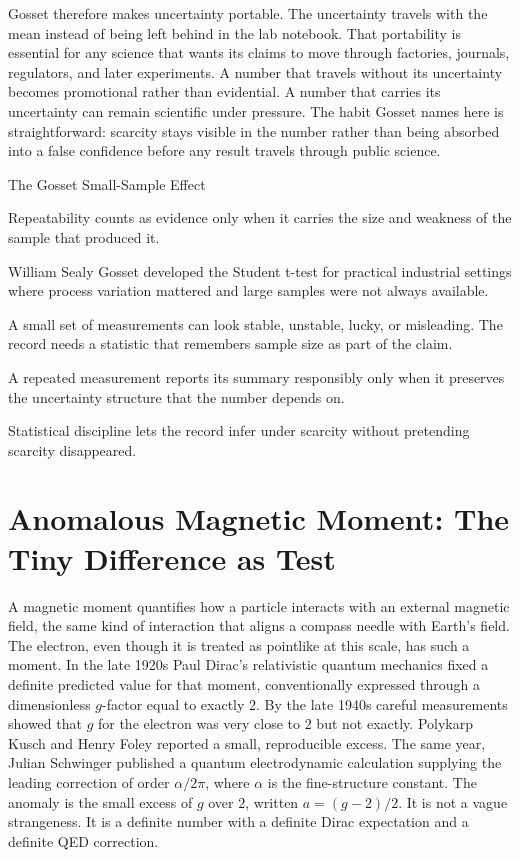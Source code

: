 Gosset therefore makes uncertainty portable. The uncertainty travels with the
mean instead of being left behind in the lab notebook. That portability is
essential for any science that wants its claims to move through factories,
journals, regulators, and later experiments. A number that travels without
its uncertainty becomes promotional rather than evidential. A number that carries its
uncertainty can remain scientific under pressure.
The habit Gosset names here is straightforward: scarcity stays visible in the
number rather than being absorbed into a false confidence before any result
travels through public science.

\begin{phenom}{The Gosset Small-Sample Effect~\cite{gosset1908}}
\label{ph:gosset-small-sample}

\PhStatement
Repeatability counts as evidence only when it carries the size and weakness
of the sample that produced it.

\PhOrigin
William Sealy Gosset developed the Student t-test for practical industrial
settings where process variation mattered and large samples were not always
available.

\PhObservation
A small set of measurements can look stable, unstable, lucky, or misleading.
The record needs a statistic that remembers sample size as part of the claim.

\PhConstraint
A repeated measurement reports its summary responsibly only when it preserves
the uncertainty structure that the number depends on.

\PhConsequence
Statistical discipline lets the record infer under scarcity without pretending
scarcity disappeared.
\end{phenom}

\section{Anomalous Magnetic Moment: The Tiny Difference as Test}

A magnetic moment quantifies how a particle interacts with an external
magnetic field, the same kind of interaction that aligns a compass needle
with Earth's field. The electron, even though it is treated as pointlike at
this scale, has such a moment. In the late 1920s Paul
Dirac's relativistic quantum mechanics fixed a definite predicted value for
that moment, conventionally expressed through a dimensionless $g$-factor
equal to exactly $2$. By the late 1940s careful measurements showed that
$g$ for the electron was very close to $2$ but not exactly. Polykarp Kusch
and Henry Foley reported a small, reproducible excess. The same year, Julian
Schwinger published a quantum electrodynamic calculation supplying the
leading correction of order $\alpha/2\pi$, where $\alpha$ is the
fine-structure constant. The anomaly is the small excess of $g$ over $2$,
written $a = (g-2)/2$. It is not a vague strangeness. It is a definite number
with a definite Dirac expectation and a definite QED correction.

